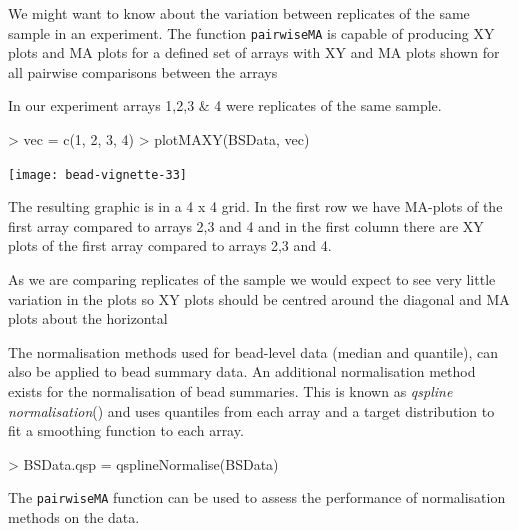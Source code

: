 \documentclass[a4paper]{article}
\newcommand{\Rfunction}[1]{{\texttt{#1}}}
\begin{document}
We might want to know about the variation between replicates of the same sample in an experiment. The function \Rfunction{pairwiseMA} is capable of producing XY plots and MA plots for a defined set of arrays with XY and MA plots shown for all pairwise comparisons between the arrays

In our experiment arrays 1,2,3 \& 4 were replicates of the same sample.

\begin{center}
\begin{Schunk}
\begin{Sinput}
> vec = c(1, 2, 3, 4)
> plotMAXY(BSData, vec)
\end{Sinput}
\end{Schunk}
\texttt{[image: bead-vignette-33]}



\end{center}

The resulting graphic is in a 4 x 4 grid. In the first row we have MA-plots of the first array compared to arrays 2,3 and 4 and in the first column there are XY plots of the first array compared to arrays 2,3 and 4. 

As we are comparing replicates of the sample we would expect to see very little variation in the plots so XY plots should be centred around the diagonal and MA plots about the horizontal

The normalisation methods used for bead-level data (median and quantile), can also be applied to bead summary data. An additional normalisation method exists for the normalisation of bead summaries. This is known as \emph{qspline normalisation}(\cite{workman}) and uses quantiles from each array and a target distribution to fit a smoothing function to each array. 

\begin{Schunk}
\begin{Sinput}
> BSData.qsp = qsplineNormalise(BSData)
\end{Sinput}
\end{Schunk}

The \Rfunction{pairwiseMA} function can be used to assess the
performance of normalisation methods on the data.


\end{document}
